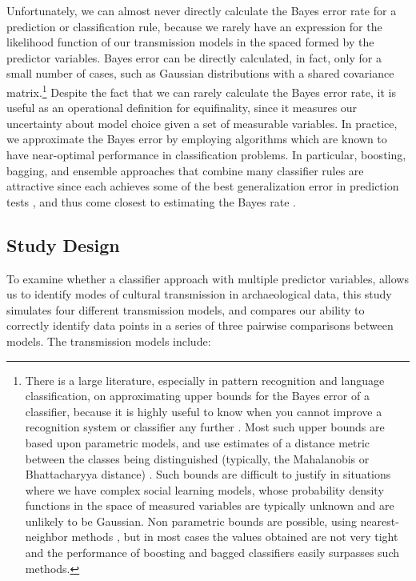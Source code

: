 \documentclass[10pt,letterpaper]{article}
\begin{document}
Unfortunately, we can almost never directly calculate the Bayes error
rate for a prediction or classification rule, because we rarely have an
expression for the likelihood function of our transmission models in the
spaced formed by the predictor variables. Bayes error can be directly calculated, in fact, only for
a small number of cases, such as Gaussian distributions with a shared
covariance
matrix.\footnote{There is a large literature, especially in pattern recognition and language classification, on approximating upper bounds for the Bayes error of a classifier, because it is highly useful to know when you cannot improve a recognition system or classifier any further \cite{Antos:1999dn, Dobbin:2009du, McLachlan:1975eo}.  Most such upper bounds are based upon parametric models, and use estimates of a distance metric between the classes being distinguished (typically, the Mahalanobis or Bhattacharyya distance) \cite{devijver1982pattern}.  Such bounds are difficult to justify in situations where we have complex social learning models, whose probability density functions in the space of measured variables are typically unknown and are unlikely to be Gaussian.  Non parametric bounds are possible, using nearest-neighbor methods \cite{Loizou:1987bi}, but in most cases the values obtained are not very tight and the performance of boosting and bagged classifiers easily surpasses such methods.}
Despite the fact that we can rarely calculate the Bayes error rate, it
is useful as an operational definition for equifinality, since it
measures our uncertainty about model choice given a set of measurable
variables. In practice, we approximate the Bayes error by employing
algorithms which are known to have near-optimal performance in
classification problems. In particular, boosting, bagging, and ensemble
approaches that combine many classifier rules are attractive since each
achieves some of the best generalization error in prediction tests
\cite{hastie2009elements}, and thus come closest to estimating the
Bayes rate \cite{tumer2003bayes}.  


\subsection{Study Design}\label{model-comparisons}

To examine whether a classifier approach with multiple predictor variables, allows us to identify modes of cultural transmission in archaeological data, this study simulates four different transmission models, and compares our ability to correctly identify data points in a series of three pairwise comparisons between models.  The transmission models include:
\end{document}
